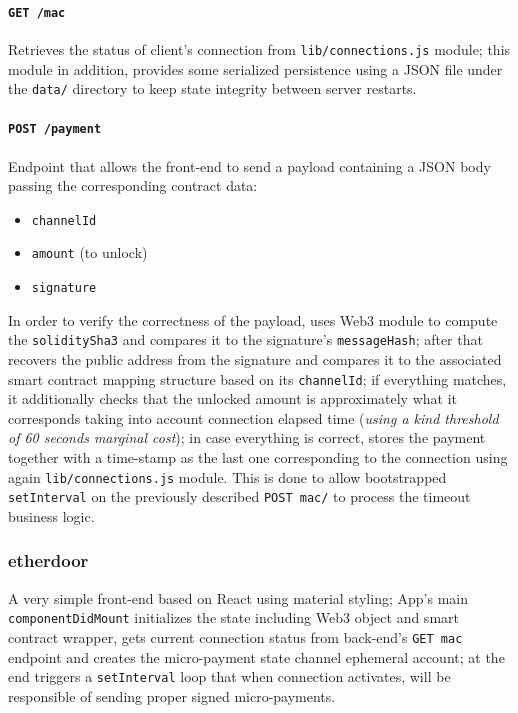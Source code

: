 \documentclass[12pt]{amsart}
\begin{document}
\begin{multicols}{2}
\vspace{0.35cm}

\paragraph{\texttt{GET /mac}} Retrieves the status of client's
connection from \texttt{lib/connections.js} module; this module
in addition, provides some serialized persistence using a JSON
file under the \texttt{data/} directory to keep state integrity
between server restarts.

\vspace{0.35cm}

\paragraph{\texttt{POST /payment}} Endpoint that allows the front-end
to send a payload containing a JSON body passing the corresponding
contract data:

\begin{itemize}
\item \texttt{channelId}
\item \texttt{amount} (to unlock)
\item \texttt{signature}
\end{itemize}

In order to verify the correctness of the payload, uses Web3
module to compute the \texttt{soliditySha3} and compares it
to the signature's \texttt{messageHash}; after that recovers
the public address from the signature and compares it to
the associated smart contract mapping structure based on its
\texttt{channelId}; if everything matches, it additionally checks
that the unlocked amount is approximately what it corresponds
taking into account connection elapsed time
(\textit{using a kind threshold of 60 seconds marginal cost});
in case everything is correct, stores the payment together
with a time-stamp as the last one corresponding
to the connection using again \texttt{lib/connections.js} module.
This is done to allow bootstrapped \texttt{setInterval}
on the previously described \texttt{POST mac/} to process
the timeout business logic.

\subsubsection{etherdoor} A very simple front-end based on React
using material styling; App's main \texttt{componentDidMount}
initializes the state including Web3 object and smart contract
wrapper, gets current connection status from back-end's
\texttt{GET mac} endpoint and creates the micro-payment
state channel ephemeral account; at the end triggers a
\texttt{setInterval} loop that when connection activates,
will be responsible of sending proper signed micro-payments.


\end{multicols}
\end{document}
